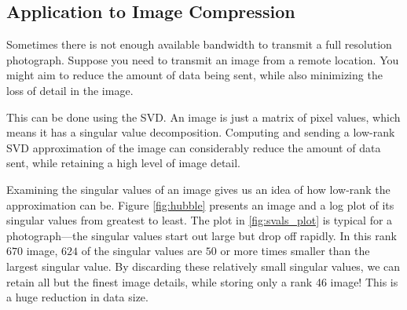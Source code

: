\subsection*{Application to Image Compression}

Sometimes there is not enough available bandwidth to transmit a full resolution photograph.
Suppose you need to transmit an image from a remote location.
You might aim to reduce the amount of data being sent, while also minimizing the loss of detail in the image.

This can be done using the SVD.
An image is just a matrix of pixel values, which means it has a singular value decomposition.
Computing and sending a low-rank SVD approximation of the image can considerably reduce the amount of data sent, while retaining a high level of image detail.

Examining the singular values of an image gives us an idea of how low-rank the approximation can be.
Figure \ref{fig:hubble} presents an image and a log plot of its singular values from greatest to least.
The plot in \ref{fig:svals_plot} is typical for a photograph---the singular values start out large but drop off rapidly.
In this rank $670$ image, $624$ of the singular values are $50$ or more times smaller than the largest singular value.
By discarding these relatively small singular values, we can retain all but the finest image details, while storing only a rank 46 image!
This is a huge reduction in data size.

